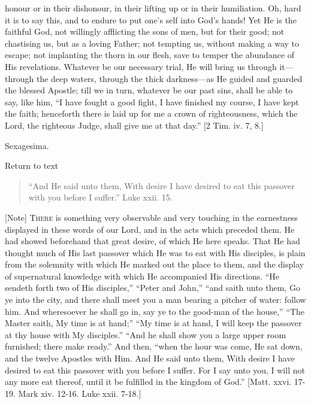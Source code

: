 honour or in their dishonour, in their lifting up or in their
humiliation. Oh, hard it is to say this, and to endure to put one's
self into God's hands! Yet He is the faithful God, not willingly
afflicting the sons of men, but for their good; not chastising us, but
as a loving Father; not tempting us, without making a way to escape;
not implanting the thorn in our flesh, save to temper the abundance of
His revelations. Whatever be our necessary trial, He will bring us
through it—through the deep waters, through the thick darkness—as
He guided and guarded the blessed Apostle; till we in turn, whatever
be our past sins, shall be able to say, like him, ``I have fought
a good fight, I have finished my course, I have kept the faith;
henceforth there is laid up for me a crown of righteousness, which the
Lord, the righteous Judge, shall give me at that day.'' [2 Tim.
iv. 7, 8.]


Sexagesima.

Return to text


\begin{quote}

``And He said unto them, With desire I have desired to eat
this passover with you before I suffer.'' Luke xxii. 15.

\end{quote}

[Note] T\textsc{here} is something very observable and very touching in the
earnestness displayed in these words of our Lord, and in the acts
which preceded them. He had showed beforehand that great desire, of
which He here speaks. That He had thought much of His last passover
which He was to eat with His disciples, is plain from the solemnity
with which He marked out the place to them, and the display of
supernatural knowledge with which He accompanied His directions.
``He sendeth forth two of His disciples,'' ``Peter and
John,'' ``and saith unto them, Go ye into the city, and there
shall meet you a man bearing a pitcher of water: follow him. And
wheresoever he shall go in, say ye to the good-man of the house,''
``The Master saith, My time is at hand;'' ``My time is at
hand, I will keep the passover at thy house with My disciples.''
``And he shall show you a large upper room furnished; there make
ready.'' And then, ``when the hour was come, He sat down, and
the twelve Apostles with Him. And He said unto them, With desire I
have desired to eat this passover with you before I suffer. For I say
unto you, I will not any more eat thereof, until it be fulfilled in
the kingdom of God.'' [Matt. xxvi. 17-19. Mark xiv. 12-16. Luke
xxii. 7-18.]

